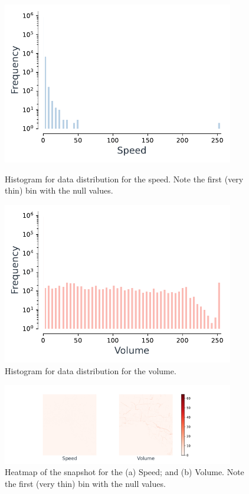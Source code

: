\begin{figure}[!ht]
    \centering
    \begin{minipage}{0.45\textwidth}
        \centering
        \includegraphics[width=0.9\textwidth]{./figures/speed.pdf}
         \caption{Histogram for data distribution for the speed. Note the first (very thin) bin with the null values.}
         \label{fig:speed}
    \end{minipage}\hfill
    \begin{minipage}{0.45\textwidth}
        \centering
        \includegraphics[width=0.9\textwidth]{./figures/volume.pdf}
         \caption{Histogram for data distribution for the volume.}
         \label{fig:volume}
    \end{minipage}
\end{figure}


\begin{figure}[!ht]
\noindent\hspace{0.5mm}\includegraphics[width=0.9\textwidth]{./figures/heatmaps_speed_volume.pdf}
\caption{Heatmap of the snapshot for the (a) Speed; and (b) Volume. Note the first (very thin) bin with the null values.}
\label{fig:heatmap}
\end{figure}

